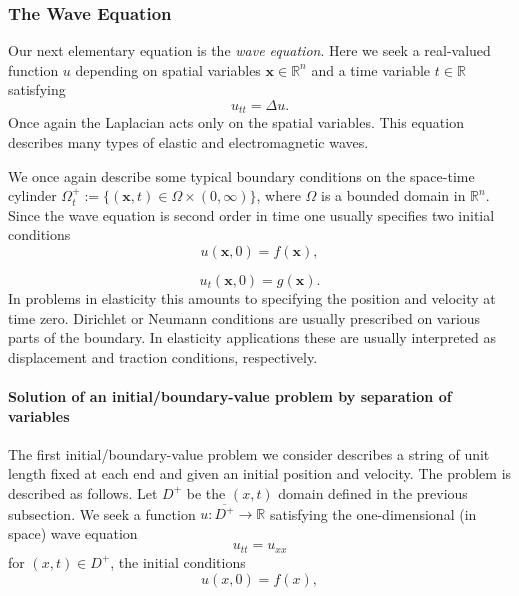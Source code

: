 \subsubsection{The Wave Equation}\label{subsec:wave-equation}

Our next elementary equation is the \emph{wave equation}. Here we seek a real-valued function $u$ depending on spatial variables $\bm{x}\in\mathbb{R}^n$ and a time variable $t\in\mathbb{R}$ satisfying
\begin{equation}\label{eq:wave-general}
u_{tt}=\Delta u.
\end{equation}
Once again the Laplacian acts only on the spatial variables. This equation describes many types of elastic and electromagnetic waves.

We once again describe some typical boundary conditions on the space-time cylinder $\Omega_t^+:=\{(\bm{x},t)\in\Omega\times(0,\infty)\}$, where $\Omega$ is a bounded domain in $\mathbb{R}^n$. Since the wave equation is second order in time one usually specifies two initial conditions
\begin{equation}\label{eq:wave-general-initial-position}
u(\bm{x},0)=f(\bm{x}),
\end{equation}

\begin{equation}\label{eq:wave-general-initial-velocity}
u_t(\bm{x},0)=g(\bm{x}).
\end{equation}
In problems in elasticity this amounts to specifying the position and velocity at time zero. Dirichlet or Neumann conditions are usually prescribed on various parts of the boundary. In elasticity applications these are usually interpreted as displacement and traction conditions, respectively.

\paragraph*{Solution of an initial/boundary-value problem by separation of variables}

The first initial/boundary-value problem we consider describes a string of unit length fixed at each end and given an initial position and velocity. The problem is described as follows. Let $D^+$ be the $(x,t)$ domain defined in the previous subsection. We seek a function $u:\overline{D^+}\to\mathbb{R}$ satisfying the one-dimensional (in space) wave equation
\begin{equation}\label{eq:wave-one-dimensional}
u_{tt}=u_{xx}
\end{equation}
for $(x,t)\in D^+$, the initial conditions
\begin{equation}\label{eq:wave-interval-initial-position}
u(x,0)=f(x),
\end{equation}

